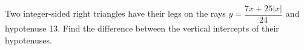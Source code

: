 Two integer-sided right triangles have their legs on the rays $y=\dfrac{7x+25|x|}{24}$ and hypotenuse 13. Find the difference between the vertical intercepts of their hypotenuses.
